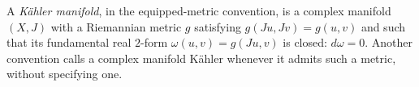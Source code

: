 
A \emph{Kähler manifold}, in the equipped-metric convention, is a complex manifold $(X,J)$ with a Riemannian metric $g$ satisfying $g(Ju,Jv)=g(u,v)$ and such that its fundamental real $2$-form $\omega(u,v)=g(Ju,v)$ is closed: $d\omega=0$. Another convention calls a complex manifold Kähler whenever it admits such a metric, without specifying one.
